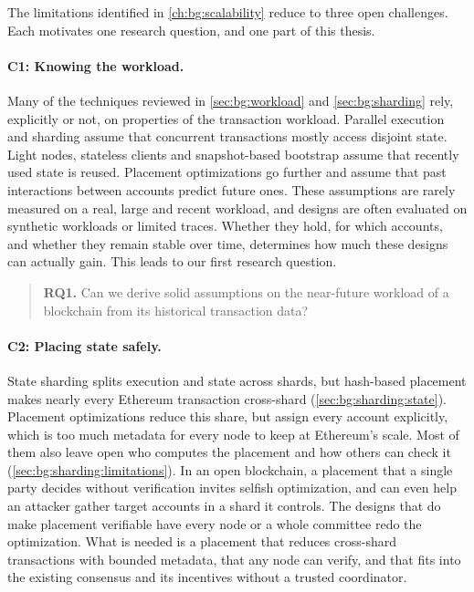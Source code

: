 The limitations identified in \autoref{ch:bg:scalability} reduce to three open challenges.
Each motivates one research question, and one part of this thesis.

\paragraph{C1: Knowing the workload.}
Many of the techniques reviewed in \autoref{sec:bg:workload} and \autoref{sec:bg:sharding} rely, explicitly or not, on properties of the transaction workload.
Parallel execution and sharding assume that concurrent transactions mostly access disjoint state.
Light nodes, stateless clients and snapshot-based bootstrap assume that recently used state is reused.
Placement optimizations go further and assume that past interactions between accounts predict future ones.
These assumptions are rarely measured on a real, large and recent workload,  and designs are often evaluated on synthetic workloads or limited traces. 
Whether they hold, for which accounts, and whether they remain stable over time, determines how much these designs can actually gain.
This leads to our first research question.

\begin{quote}
	\textbf{RQ1.} Can we derive solid assumptions on the near-future workload of a blockchain from its historical transaction data?
\end{quote}

\paragraph{C2: Placing state safely.}
State sharding splits execution and state across shards, but hash-based placement makes nearly every Ethereum transaction cross-shard (\autoref{sec:bg:sharding:state}).
Placement optimizations reduce this share, but assign every account explicitly, which is too much metadata for every node to keep at Ethereum's scale.
Most of them also leave open who computes the placement and how others can check it (\autoref{sec:bg:sharding:limitations}).
In an open blockchain, a placement that a single party decides without verification invites selfish optimization, and can even help an attacker gather target accounts in a shard it controls.
The designs that do make placement verifiable have every node or a whole committee redo the optimization.
What is needed is a placement that reduces cross-shard transactions with bounded metadata, that any node can verify, and that fits into the existing consensus and its incentives without a trusted coordinator.

